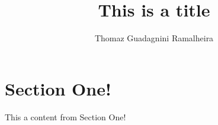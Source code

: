 \documentclass[12pt, a4paper]{article}
\title{This is a title}
\author{Thomaz Guadagnini Ramalheira}
\begin{document}
    \maketitle

    \section{Section One!}
    This a content from Section One!
\end{document}
